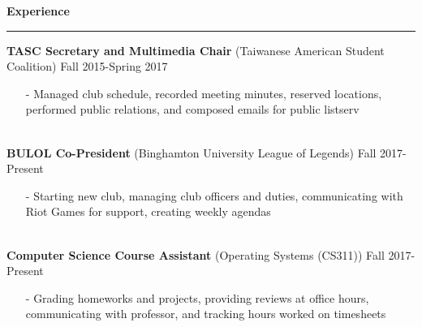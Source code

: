 \documentclass[11pt]{article}
\newcommand{\Hrule}{\vspace{1mm}\hrule\vspace{1mm}}
\begin{document}
    \noindent\large\textbf{Experience}
        \Hrule
        \indent\small{\textbf{TASC Secretary and Multimedia Chair} (Taiwanese American Student Coalition)} \hfill \small{Fall 2015-Spring 2017}\indent\vspace{0.5mm}
            \indent\begin{minipage}{\dimexpr\textwidth-6cm}
                \begin{itemize}[noitemsep, topsep=0pt]
                    \item[-] Managed club schedule, recorded meeting minutes, reserved locations, performed public relations, and composed emails for public listserv
                \end{itemize}\vspace{0mm}
            \end{minipage}\\
        \indent\small{\textbf{BULOL Co-President} (Binghamton University League of Legends)} \hfill \small{Fall 2017-Present}\indent\vspace{0.5mm}\\
            \indent\begin{minipage}{\dimexpr\textwidth-6cm}
                \begin{itemize}[noitemsep, topsep=0pt]
                    \item[-] Starting new club, managing club officers and duties, communicating with Riot Games for support, creating weekly agendas
                \end{itemize}\vspace{0mm}
            \end{minipage}\\
        \indent\small{\textbf{Computer Science Course Assistant} (Operating Systems (CS311))} \hfill \small{Fall 2017-Present}\indent\vspace{0.5mm}\\
            \indent\begin{minipage}{\dimexpr\textwidth-6cm}
                \begin{itemize}[noitemsep, topsep=0pt]
                    \item[-] Grading homeworks and projects, providing reviews at office hours, communicating with professor, and tracking hours worked on timesheets                    
                \end{itemize}\vspace{0mm}
            \end{minipage}\\
\end{document}
